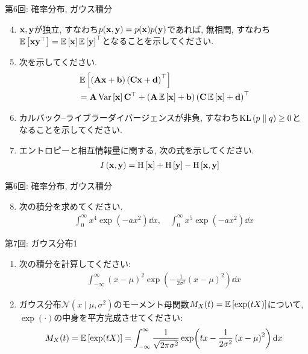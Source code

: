 \documentclass[dvipdfmx,notheorems,t]{beamer}
\begin{document}
\begin{frame}{第6回: 確率分布, ガウス積分}
\begin{enumerate}
  \setcounter{enumi}{3}
  \item $\vb{x}, \vb{y}$が独立, すなわち$p(\vb{x}, \vb{y}) = p(\vb{x}) p(\vb{y})$であれば,
  無相関, すなわち$\operatorname{\mathbb{E}} \left[ \vb{x} \vb{y}^\top \right] = \operatorname{\mathbb{E}} \left[ \vb{x} \right] \operatorname{\mathbb{E}} \left[ \vb{y} \right]^\top$となることを示してください.

  \item 次を示してください.
  \begin{align*}
    & \operatorname{\mathbb{E}} \left[ \left( \vb{A} \vb{x} + \vb{b} \right) \left( \vb{C} \vb{x} + \vb{d} \right)^\top \right] \\
    &= \vb{A} \operatorname{Var} \left[ \vb{x} \right] \vb{C}^\top
    + \left( \vb{A} \operatorname{\mathbb{E}} \left[ \vb{x} \right] + \vb{b} \right)
      \left( \vb{C} \operatorname{\mathbb{E}} \left[ \vb{x} \right] + \vb{d} \right)^\top
  \end{align*}

  \item カルバック--ライブラーダイバージェンスが非負, すなわち$\operatorname{KL} \left( p \parallel q \right) \ge 0$となることを示してください.

  \item エントロピーと相互情報量に関する, 次の式を示してください.
  \begin{align*}
    I \left( \vb{x}, \vb{y} \right) &= \operatorname{H} \left[ \vb{x} \right] + \operatorname{H} \left[ \vb{y} \right] - \operatorname{H} \left[ \vb{x}, \vb{y} \right]
  \end{align*}
\end{enumerate}
\end{frame}

\begin{frame}{第6回: 確率分布, ガウス積分}
\begin{enumerate}
  \setcounter{enumi}{7}
  \item 次の積分を求めてください.
  \begin{align*}
    \int_0^\infty x^4 \exp(-a x^2) \dd{x}, \quad \int_0^\infty x^5 \exp(-a x^2) \dd{x}
  \end{align*}
\end{enumerate}
\end{frame}

\begin{frame}{第7回: ガウス分布1}
\begin{enumerate}
  \item 次の積分を計算してください:
  \begin{align*}
    \int_{-\infty}^\infty (x - \mu)^2
      \exp \left( -\frac{1}{2 \sigma^2} \left( x - \mu \right)^2 \right) \dd{x}
  \end{align*}

  \item ガウス分布$\mathcal{N}(x \mid \mu, \sigma^2)$のモーメント母関数$M_X(t) = \operatorname{\mathbb{E}} \left[ \exp(tX) \right]$について,
  $\exp(\cdot)$の中身を平方完成させてください:
  \begin{align*}
    M_X(t) = \operatorname{\mathbb{E}} \left[ \exp(tX) \right] = \int_{-\infty}^\infty \frac{1}{\sqrt{2\pi \sigma^2}}
      \exp(tx -\frac{1}{2 \sigma^2} \left( x - \mu \right)^2) \dd{x}
  \end{align*}
\end{enumerate}
\end{frame}
\end{document}
